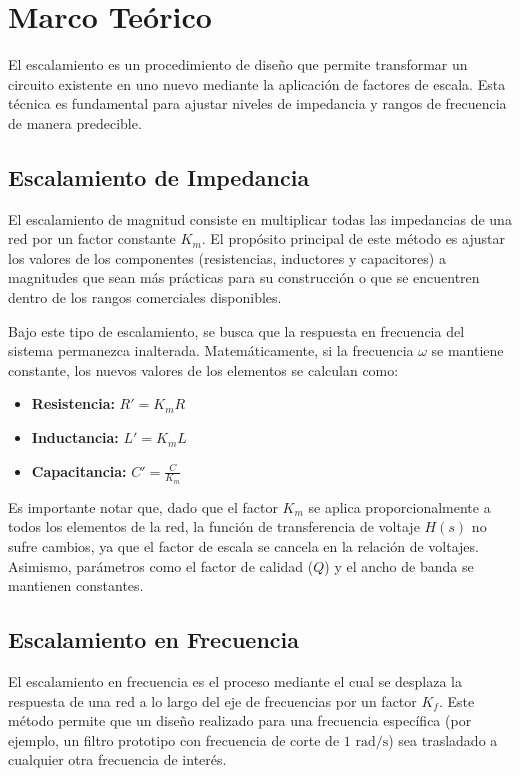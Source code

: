 \section{Marco Teórico}
El escalamiento es un procedimiento de diseño que permite transformar un circuito existente en uno nuevo mediante la aplicación de factores de escala. Esta técnica es fundamental para ajustar niveles de impedancia y rangos de frecuencia de manera predecible.

\subsection{Escalamiento de Impedancia}
El escalamiento de magnitud consiste en multiplicar todas las impedancias de una red por un factor constante $K_m$. El propósito principal de este método es ajustar los valores de los componentes (resistencias, inductores y capacitores) a magnitudes que sean más prácticas para su construcción o que se encuentren dentro de los rangos comerciales disponibles.

Bajo este tipo de escalamiento, se busca que la respuesta en frecuencia del sistema permanezca inalterada. Matemáticamente, si la frecuencia $\omega$ se mantiene constante, los nuevos valores de los elementos se calculan como:
\begin{itemize}
	\item \textbf{Resistencia:} $R' = K_m R$
	\item \textbf{Inductancia:} $L' = K_m L$
	\item \textbf{Capacitancia:} $C' = \frac{C}{K_m}$
\end{itemize}

Es importante notar que, dado que el factor $K_m$ se aplica proporcionalmente a todos los elementos de la red, la función de transferencia de voltaje $H(s)$ no sufre cambios, ya que el factor de escala se cancela en la relación de voltajes. Asimismo, parámetros como el factor de calidad ($Q$) y el ancho de banda se mantienen constantes.

\subsection{Escalamiento en Frecuencia}
El escalamiento en frecuencia es el proceso mediante el cual se desplaza la respuesta de una red a lo largo del eje de frecuencias por un factor $K_f$. Este método permite que un diseño realizado para una frecuencia específica (por ejemplo, un filtro prototipo con frecuencia de corte de $1 \text{ rad/s}$) sea trasladado a cualquier otra frecuencia de interés.

